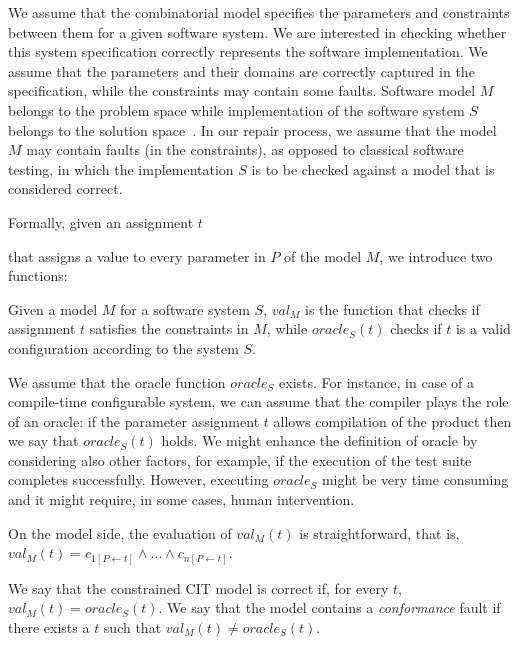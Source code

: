 \begin{tikzborder}{\cite{Gargantini16:validation}}
\begin{tikzborder}{\cite{gargantini_combinatorial_2017}}
\bb
We assume that the combinatorial model specifies the parameters and constraints between them for a given software system. 
We are interested in checking whether this system specification 
correctly represents the software implementation. We assume that the parameters and their domains are correctly captured in the specification, while the constraints may contain some faults. 
Software model $M$ belongs to the problem space while implementation of the software system $S$ belongs to the solution space~\cite{NadiBKC14}.
In our repair process, we assume that the model $M$ may contain faults (in the constraints), as opposed to classical software testing, in which the implementation $S$ is to be checked against a model that is considered correct.



Formally, given an assignment $t$ 

that assigns a value to every parameter in $P$ of the model $M$,
we introduce two functions:
\begin{defn}%
	Given a model $M$ for a software system $S$, $val_{M}$ is the function
	that checks if assignment $t$ 
	satisfies the constraints in $M$, while
	$\mathit{oracle}_{S}(t
	)$ checks if $t$ 
	is a valid configuration according to the system $S$.
\end{defn}


We assume that the oracle function $\mathit{oracle}_{S}$ exists. For instance, in case of a compile-time configurable system, we can assume that the compiler plays the role of an oracle: if the parameter assignment $t$ allows compilation of the product then we say that $\mathit{oracle}_{S}(t)$ holds. We might enhance the definition of oracle by considering also other factors, for example, if the execution of the test suite completes successfully. However, executing  $\mathit{oracle}_{S}$ might be very time consuming and it might require, in some cases, human intervention.

On the model side, the evaluation of  $val_{M}(t
)$ is straightforward, that is, $val_{M}(
t)=c_{1[P\leftarrow
	t]}\wedge \ldots\wedge c_{n[P\leftarrow
	t]}$.


\begin{defn}
	\label{def:correctness}We say that the constrained CIT model is correct if, for
	every $t$, $val_{M}(t)=\mathit{oracle}_{S}(t)$. We say that the model
	contains a \emph{conformance} fault if there exists a $t$ 
	such that $val_{M}(
	t)\neq \mathit{oracle}_{S}(
	t)$.
\end{defn}
\be


\end{tikzborder}
\end{tikzborder}
